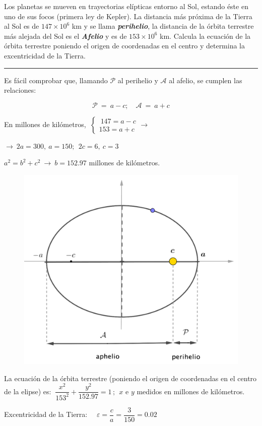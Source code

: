 \vspace{4mm}
\begin{miejercicio}

Los planetas se mueven en trayectorias elípticas entorno al Sol, estando éste en uno de sus focos (primera ley de Kepler). La distancia más próxima de la Tierra al Sol es de $147\times 10^6$ km y se llama \textbf{\emph{perihelio}}, la distancia de la órbita terrestre más alejada del Sol es el \textbf{\emph{Afelio}} y es de $153\times 10^6$ km. Calcula la ecuación de la órbita terrestre poniendo el origen de coordenadas en el centro y determina la excentricidad de la Tierra.

\rule{250pt}{0.1pt}

\begin{multicols}{2}
Es fácil comprobar que, llamando $\mathcal P$ al perihelio y $\mathcal A$ al afelio, se cumplen las relaciones:

$$\mathcal P\  = \ a-c;\quad \mathcal A\ = \ a+c$$

En millones de kilómetros, $\ \begin{cases} \ 147=a-c\\ 153=a+c \end{cases} \to $

\vspace{2mm}$\to \ 2a=300, \ a=150;\ \ 2c=6,\ c=3$

\vspace{2mm} $a^2=b^2+c^2 \ \to \ b=152.97$ millones de kilómetros.


\begin{figure}[H]
	\centering
	\includegraphics[width=.5\textwidth]{img-conicas/conicas29.png}
	\end{figure}	
\end{multicols}

La ecuación de la órbita terrestre (poniendo el origen de coordenadas en el centro de la elipse) es: $\ \dfrac{x^2}{153^2}+\dfrac{y^2}{152.97}=1\, ; \ \ x$ e $y$ medidos en millones de kilómetros.

\vspace{2mm} Excentricidad de la Tierra: $\quad 	\varepsilon=\dfrac c a =\dfrac 3{150}=0.02$
\end{miejercicio}






